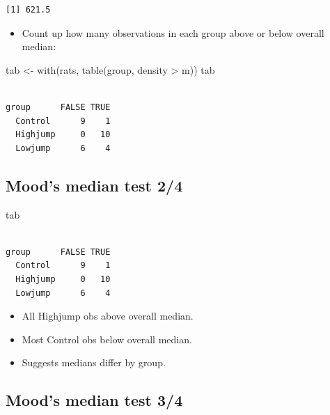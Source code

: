 \documentclass[
  letterpaper,
  DIV=11,
  numbers=noendperiod]{scrartcl}
\newenvironment{Shaded}{\begin{snugshade}}{\end{snugshade}}
\newcommand{\FunctionTok}[1]{\textcolor[rgb]{0.28,0.35,0.67}{#1}}
\newcommand{\NormalTok}[1]{\textcolor[rgb]{0.00,0.23,0.31}{#1}}
\newcommand{\OtherTok}[1]{\textcolor[rgb]{0.00,0.23,0.31}{#1}}
\newcommand{\SpecialCharTok}[1]{\textcolor[rgb]{0.37,0.37,0.37}{#1}}
\providecommand{\tightlist}{%
  \setlength{\itemsep}{0pt}\setlength{\parskip}{0pt}}\usepackage{longtable,booktabs,array}
\begin{document}
\begin{verbatim}
[1] 621.5
\end{verbatim}

\normalsize

\begin{itemize}
\tightlist
\item
  Count up how many observations in each group above or below overall
  median:
\end{itemize}

\begin{Shaded}
\begin{Highlighting}[]
\NormalTok{tab }\OtherTok{\textless{}{-}} \FunctionTok{with}\NormalTok{(rats, }\FunctionTok{table}\NormalTok{(group, density }\SpecialCharTok{\textgreater{}}\NormalTok{ m))}
\NormalTok{tab}
\end{Highlighting}
\end{Shaded}

\begin{verbatim}
          
group      FALSE TRUE
  Control      9    1
  Highjump     0   10
  Lowjump      6    4
\end{verbatim}

\hypertarget{moods-median-test-24}{%
\subsection{Mood's median test 2/4}\label{moods-median-test-24}}

\begin{Shaded}
\begin{Highlighting}[]
\NormalTok{tab}
\end{Highlighting}
\end{Shaded}

\begin{verbatim}
          
group      FALSE TRUE
  Control      9    1
  Highjump     0   10
  Lowjump      6    4
\end{verbatim}

\begin{itemize}
\tightlist
\item
  All Highjump obs above overall median.
\item
  Most Control obs below overall median.
\item
  Suggests medians differ by group.
\end{itemize}

\hypertarget{moods-median-test-34}{%
\subsection{Mood's median test 3/4}\label{moods-median-test-34}}
\end{document}
